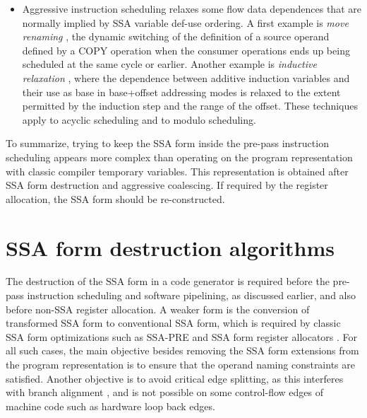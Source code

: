 \begin{itemize}
\item Aggressive instruction scheduling relaxes some flow data dependences that
are normally implied by SSA variable def-use ordering. A first example is
\emph{move renaming} \cite{Young:1998:MICRO}, the dynamic switching of the
definition of a source operand defined by a COPY operation when the consumer
operations ends up being scheduled at the same cycle or earlier. Another example
is \emph{inductive relaxation} \cite{Dinechin:1997:PaCT}, where the dependence
between additive induction variables and their use as base in base+offset
addressing modes is relaxed to the extent permitted by the induction step and
the range of the offset. These techniques apply to acyclic scheduling and to
modulo scheduling.

\end{itemize}

To summarize, trying to keep the SSA form inside the pre-pass instruction scheduling
appears more complex than operating on the program representation with classic
compiler temporary variables. This representation is obtained after SSA form
destruction and aggressive coalescing. If required by the register allocation,
the SSA form should be re-constructed.


\section{SSA form destruction algorithms} \label{sec:ssa-destruction}


The destruction of the SSA form in a code generator is required before the
pre-pass instruction scheduling and software pipelining, as discussed earlier,
and also before non-SSA register allocation.  A weaker form is the conversion of
transformed SSA form to conventional SSA form, which is required by classic SSA
form optimizations such as SSA-PRE \cite{Kennedy:1999:TOPLAS} and SSA form
register allocators \cite{Pereira:2008:PLDI}. For all such cases, the main
objective besides removing the SSA form extensions from the program
representation is to ensure that the operand naming constraints are satisfied.
Another objective is to avoid critical edge splitting, as this interferes with
branch alignment \cite{Calder:1994:ASPLOS}, and is not possible on some
control-flow edges of machine code such as hardware loop back edges.

